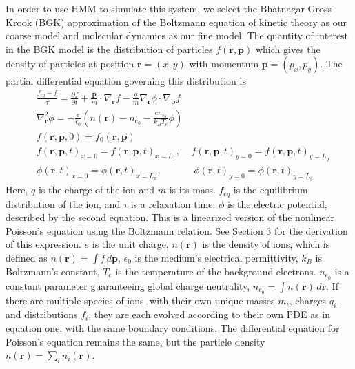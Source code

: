 \documentclass{article}
\begin{document}
In order to use HMM to simulate this system, we select the Bhatnagar-Gross-Krook (BGK) approximation of the Boltzmann equation of kinetic theory as our coarse model and molecular dynamics as our fine model. The quantity of interest in the BGK model is the distribution of particles $f(\mathbf{r},\mathbf{p})$ which gives the density of particles at position $\mathbf{r}=(x,y)$ with momentum $\mathbf{p}=(p_x,p_y)$. The partial differential equation governing this distribution is
\begin{equation}
\begin{split}
&\frac{f_{eq}-f}{\tau}=\frac{\partial f}{\partial t}+\frac{\mathbf{p}}{m}\cdot \nabla_\mathbf{r} f-\frac{q}{m}\nabla_\mathbf{r}\phi\cdot\nabla_\mathbf{p}f\\
&\nabla^2_\mathbf{r}\phi=-\frac{e}{\epsilon_0}\left(n(\mathbf{r})-n_{e_0}-\frac{en_{e_0}}{k_BT_e}\phi\right)\\
&f(\mathbf{r},\mathbf{p},0)=f_0(\mathbf{r},\mathbf{p})\\
&f(\mathbf{r},\mathbf{p},t)_{x=0}=f(\mathbf{r},\mathbf{p},t)_{x=L_x},\;\;\;\;
f(\mathbf{r},\mathbf{p},t)_{y=0}=f(\mathbf{r},\mathbf{p},t)_{y=L_y}\\
&\phi(\mathbf{r},t)_{x=0}=\phi(\mathbf{r},t)_{x=L_x},\;\;\;\;\;\;\;\;\;\;\;\;
\phi(\mathbf{r},t)_{y=0}=\phi(\mathbf{r},t)_{y=L_y}
\end{split}\label{eq:BGK}
\end{equation}Here, $q$ is the charge of the ion and $m$ is its mass. $f_{eq}$ is the equilibrium distribution of the ion, and $\tau$ is a relaxation time. $\phi$ is the electric potential, described by the second equation. This is a linearized version of the nonlinear Poisson's equation using the Boltzmann relation. See Section 3 for the derivation of this expression. $e$ is the unit charge, $n(\mathbf{r})$ is the density of ions, which is defined as $n(\mathbf{r})=\int f\, d\mathbf{p}$, $\epsilon_0$ is the medium's electrical permittivity, $k_B$ is Boltzmann's constant, $T_e$ is the temperature of the background electrons. $n_{e_0}$ is a constant parameter guaranteeing global charge neutrality, $n_{e_0}=\int n(\mathbf{r})\,d\mathbf{r}$. If there are multiple species of ions, with their own unique masses $m_i$, charges $q_i$, and distributions $f_i$, they are each evolved according to their own PDE as in equation one, with the same boundary conditions. The differential equation for Poisson's equation remains the same, but the particle density $n(\mathbf{r})=\sum_i n_i(\mathbf{r})$.
\end{document}
